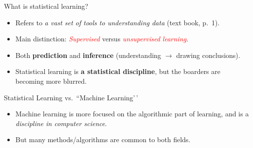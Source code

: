 \documentclass[
  10pt,
  ignorenonframetext,
]{beamer}
\providecommand{\tightlist}{%
  \setlength{\itemsep}{0pt}\setlength{\parskip}{0pt}}
\begin{document}
\begin{frame}{What is statistical learning?}
\protect\hypertarget{what-is-statistical-learning}{}
\begin{itemize}
\tightlist
\item
  Refers to \emph{a vast set of tools to understanding data} (text book,
  p.~1).
\end{itemize}

\vspace{1mm}

\begin{itemize}
\tightlist
\item
  Main distinction: \emph{\textcolor{red}{Supervised}} versus
  \emph{\textcolor{red}{unsupervised learning}}.
\end{itemize}

\vspace{1mm}

\begin{itemize}
\tightlist
\item
  Both \textbf{prediction} and \textbf{inference} (understanding
  \(\rightarrow\) drawing conclusions).
\end{itemize}

\vspace{1mm}

\begin{itemize}
\tightlist
\item
  Statistical learning is \textbf{a statistical discipline}, but the
  boarders are becoming more blurred.
\end{itemize}
\end{frame}

\begin{frame}{Statistical Learning vs.~``Machine Learning'\,'}
\protect\hypertarget{statistical-learning-vs.-machine-learning}{}
\vspace{2mm}

\begin{itemize}
\tightlist
\item
  Machine learning is more focused on the algorithmic part of learning,
  and is a \emph{discipline in computer science}.
\end{itemize}

\vspace{2mm}

\begin{itemize}
\tightlist
\item
  But many methods/algorithms are common to both fields.
\end{itemize}
\end{frame}
\end{document}
